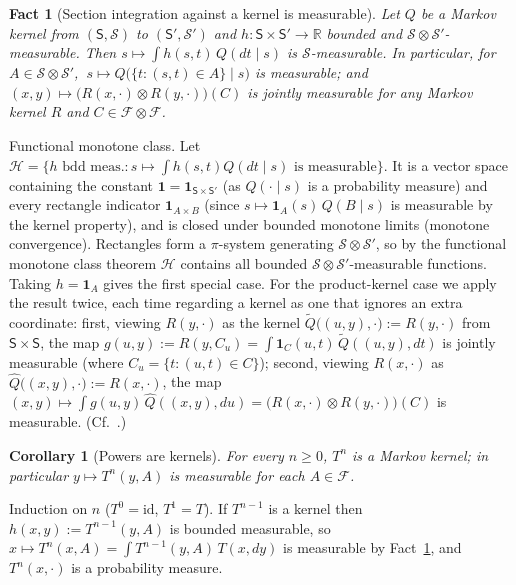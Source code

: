 \documentclass[11pt]{article}
\makeatletter
\theoremstyle{definitionbreak}
\theoremstyle{plainbreak}
\newtheorem{corollary}[theorem]{Corollary}
\newtheorem{fact}[theorem]{Fact}
\theoremstyle{remarkbreak}
\renewenvironment{proof}[1][\proofname]{\par
  \pushQED{\qed}\normalfont
  \topsep6\p@\@plus6\p@\relax
  \trivlist
  \item[\hskip\labelsep\itshape #1\@addpunct{.}]\mbox{}\par\nobreak\ignorespaces
}{\popQED\endtrivlist\@endpefalse}
\newcommand{\R}{\mathbb{R}}
\newcommand{\cF}{\mathcal{F}}
\makeatother
\begin{document}
\begin{fact}[Section integration against a kernel is measurable]
\label{fact:compose}
Let $Q$ be a Markov kernel from $(\mathsf S,\mathcal S)$ to $(\mathsf S',\mathcal S')$ and
$h:\mathsf S\times\mathsf S'\to\R$ bounded and $\mathcal S\otimes\mathcal S'$-measurable. Then
$s\mapsto\int h(s,t)\,Q(dt\mid s)$ is $\mathcal S$-measurable. In particular, for
$A\in\mathcal S\otimes\mathcal S'$, $\ s\mapsto Q\big(\{t:(s,t)\in A\}\mid s\big)$ is measurable; and
$(x,y)\mapsto\big(R(x,\cdot)\otimes R(y,\cdot)\big)(C)$ is jointly measurable for any Markov kernel
$R$ and $C\in\cF\otimes\cF$.
\end{fact}
\begin{proof}
Functional monotone class. Let $\mathcal H=\{h\text{ bdd meas.}:s\mapsto\int h(s,t)Q(dt\mid s)\text{ is
measurable}\}$. It is a vector space containing the constant $\mathbf 1=\mathbf 1_{\mathsf S\times\mathsf S'}$
(as $Q(\cdot\mid s)$ is a probability measure) and every rectangle indicator $\mathbf 1_{A\times B}$
(since $s\mapsto\mathbf 1_A(s)\,Q(B\mid s)$ is measurable by the kernel property), and is closed under
bounded monotone limits (monotone convergence). Rectangles form a $\pi$-system generating
$\mathcal S\otimes\mathcal S'$, so by the functional monotone class theorem $\mathcal H$ contains all
bounded $\mathcal S\otimes\mathcal S'$-measurable functions. Taking $h=\mathbf 1_A$ gives the first
special case. For the product-kernel case we apply the result twice, each time regarding a kernel as
one that ignores an extra coordinate: first, viewing $R(y,\cdot)$ as the kernel
$\tilde Q\big((u,y),\cdot\big):=R(y,\cdot)$ from $\mathsf S\times\mathsf S$, the map
$g(u,y):=R(y,C_u)=\int\mathbf 1_C(u,t)\,\tilde Q((u,y),dt)$ is jointly measurable (where
$C_u=\{t:(u,t)\in C\}$); second, viewing $R(x,\cdot)$ as $\hat Q\big((x,y),\cdot\big):=R(x,\cdot)$,
the map $(x,y)\mapsto\int g(u,y)\,\hat Q((x,y),du)=\big(R(x,\cdot)\otimes R(y,\cdot)\big)(C)$ is
measurable. (Cf.\ \cite[Ch.~1]{Kallenberg}.)
\end{proof}

\begin{corollary}[Powers are kernels]
\label{cor:Tn}
For every $n\ge0$, $T^n$ is a Markov kernel; in particular $y\mapsto T^n(y,A)$ is measurable for
each $A\in\cF$.
\end{corollary}
\begin{proof}
Induction on $n$ ($T^0=\mathrm{id}$, $T^1=T$). If $T^{n-1}$ is a kernel then $h(x,y):=T^{n-1}(y,A)$
is bounded measurable, so $x\mapsto T^n(x,A)=\int T^{n-1}(y,A)\,T(x,dy)$ is measurable by
Fact~\ref{fact:compose}, and $T^n(x,\cdot)$ is a probability measure.
\end{proof}
\end{document}
